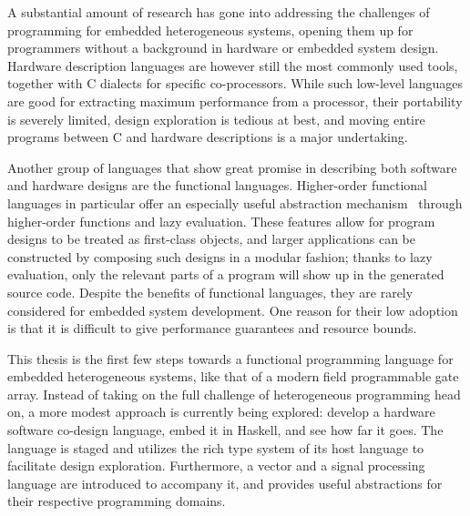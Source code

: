 \documentclass[../paper.tex]{subfiles}
\begin{document}

A substantial amount of research has gone into addressing the challenges of programming for embedded heterogeneous systems, opening them up for programmers without a background in hardware or embedded system design. Hardware description languages are however still the most commonly used tools, together with C dialects for specific co-processors. While such low-level languages are good for extracting maximum performance from a processor, their portability is severely limited, design exploration is tedious at best, and moving entire programs between C and hardware descriptions is a major undertaking.

Another group of languages that show great promise in describing both software and hardware designs are the functional languages. Higher-order functional languages in particular offer an especially useful abstraction mechanism~\cite{baaij2010, bjesse1998, gill2010} through higher-order functions and lazy evaluation. These features allow for program designs to be treated as first-class objects, and larger applications can be constructed by composing such designs in a modular fashion; thanks to lazy evaluation, only the relevant parts of a program will show up in the generated source code. Despite the benefits of functional languages, they are rarely considered for embedded system development. One reason for their low adoption is that it is difficult to give performance guarantees and resource bounds.


This thesis is the first few steps towards a functional programming language for embedded heterogeneous systems, like that of a modern field programmable gate array. Instead of taking on the full challenge of heterogeneous programming head on, a more modest approach is currently being explored: develop a hardware software co-design language, embed it in Haskell, and see how far it goes. The language is staged and utilizes the rich type system of its host language to facilitate design exploration. Furthermore, a vector and a signal processing language are introduced to accompany it, and provides useful abstractions for their respective programming domains.
\end{document}
